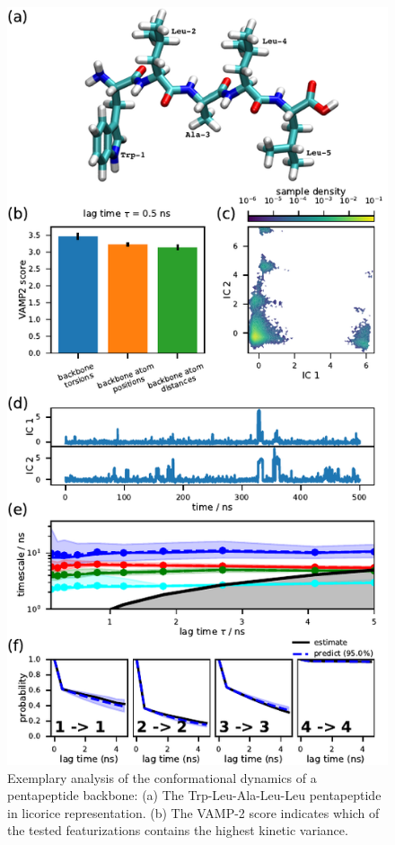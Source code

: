 \documentclass[9pt,tutorial]{livecoms}
\begin{document}
\begin{figure}
\includegraphics{figure_2}
\caption{Exemplary analysis of the conformational dynamics of a pentapeptide backbone: (a) The Trp-Leu-Ala-Leu-Leu pentapeptide in licorice representation.
(b) The VAMP-2 score indicates which of the tested featurizations contains the highest kinetic variance.
}
\end{figure}
\end{document}
